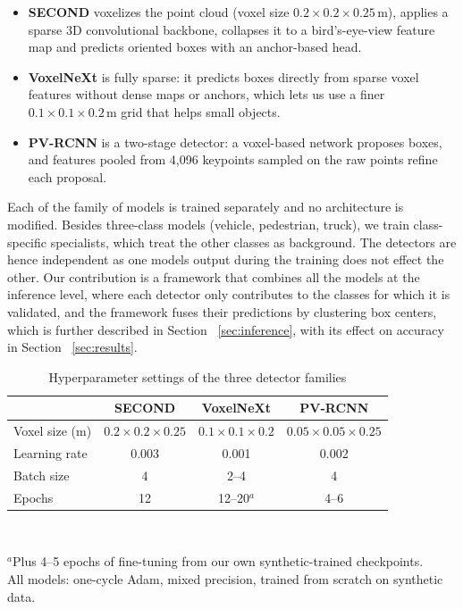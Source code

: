 \documentclass[conference]{IEEEtran}
\begin{document}
\begin{itemize}
    \item \textbf{SECOND} \cite{yan2018second} voxelizes the point cloud (voxel size $0.2\times0.2\times0.25$\,m), applies a sparse 3D convolutional backbone, collapses it to a bird's-eye-view feature map and predicts oriented boxes with an anchor-based head.
    \item \textbf{VoxelNeXt} \cite{chen2023voxelnext} is fully sparse: it predicts boxes directly from sparse voxel features without dense maps or anchors, which lets us use a finer $0.1\times0.1\times0.2$\,m grid that helps small objects.
    \item \textbf{PV-RCNN} \cite{shi2020pvrcnn} is a two-stage detector: a voxel-based network proposes boxes, and features pooled from 4,096 keypoints sampled on the raw points refine each proposal.
\end{itemize}

Each of the family of models is trained separately and no architecture is modified. Besides three-class models (vehicle, pedestrian, truck), we train class-specific specialists, which treat the other classes as background. The detectors are hence independent as one models output during the training does not effect the other. Our contribution is a framework that combines all the models at the inference level, where each detector only contributes to the classes for which it is validated, and the framework fuses their predictions by clustering box centers, which is further described in Section ~\ref{sec:inference}, with its effect on accuracy in Section ~\ref{sec:results}.

\begin{table}[H]
\caption{Hyperparameter settings of the three detector families}
\label{tab:hyperparams}
\centering
\footnotesize
\setlength{\tabcolsep}{3.5pt}
\begin{tabular*}{\columnwidth}{@{\extracolsep{\fill}}lccc@{}}
\toprule
 & \textbf{SECOND} & \textbf{VoxelNeXt} & \textbf{PV-RCNN} \\
\midrule
Voxel size (m) & $0.2{\times}0.2{\times}0.25$ & $0.1{\times}0.1{\times}0.2$ & $0.05{\times}0.05{\times}0.25$ \\
Learning rate & 0.003 & 0.001 & 0.002 \\
Batch size & 4 & 2--4 & 4 \\
Epochs & 12 & 12--20$^{a}$ & 4--6 \\
\bottomrule
\end{tabular*}\\[0.6ex]
\begin{minipage}{\columnwidth}
\raggedright\footnotesize
$^{a}$Plus 4--5 epochs of fine-tuning from our own synthetic-trained checkpoints.\\[0.3ex]
All models: one-cycle Adam, mixed precision, trained from scratch on synthetic data.
\end{minipage}
\end{table}
\end{document}
